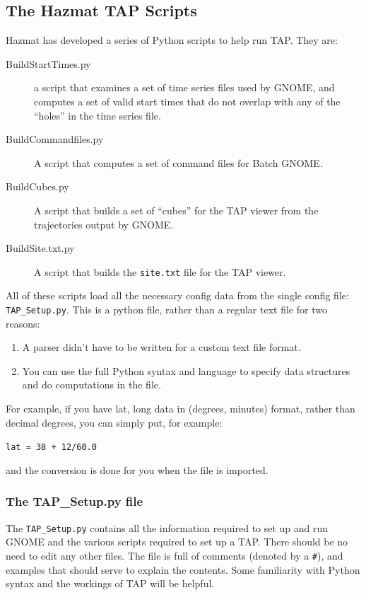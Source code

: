 \documentclass[12pt]{article}      %
\newcommand{\tap}{\textsf{TAP}\xspace}
\newcommand{\gnome}{\textsf{GNOME}\xspace}
\newcommand{\filename}[1]{\texttt{#1}}
\newcommand{\command}[1]{\texttt{#1}}
\newcommand{\fileline}[1]{\begin{flushleft}\texttt{#1}\end{flushleft}}
\begin{document}
\subsection{The Hazmat \tap Scripts}

Hazmat has developed a series of Python scripts to help run \tap. They
are:
\begin{description}
\item[BuildStartTimes.py] a script that examines a set of time series files
  used by \gnome, and computes a set of valid start times that do not
  overlap with any of the ``holes'' in the time series file.
\item[BuildCommandfiles.py] A script that computes a set of command
  files for Batch \gnome.
\item[BuildCubes.py] A script that builds a set of ``cubes'' for the
  \tap viewer from the trajectories output by \gnome.
\item[BuildSite.txt.py] A script that builds the \filename{site.txt}
  file for the \tap viewer.
\end{description}

All of these scripts load all the necessary config data from the single
config file: \filename{TAP\_Setup.py}. This is a python file, rather
than a regular text file for two reasons:
\begin{enumerate}
\item A parser didn't have to be written for a custom text file format.
\item You can use the full Python syntax and language to specify data
  structures and do computations in the file.
\end{enumerate}
For example, if you have lat, long data in (degrees, minutes) format, rather
than decimal degrees, you can simply put, for example:
\fileline{lat = 38 + 12/60.0}
and the conversion is done for you when the file is imported.

\subsubsection{The TAP\_Setup.py file}
The \filename{TAP\_Setup.py} contains all the information required to
set up and run \gnome and the various scripts required to set up a TAP.
There should be no need to edit any other files. The file is full of
comments (denoted by a \command{\#}), and examples that should serve to
explain the contents. Some familiarity with Python syntax and the
workings of \tap will be helpful.
\end{document}
